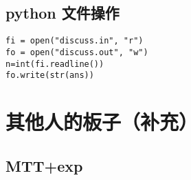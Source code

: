 \documentclass[12pt]{ctexart}
\begin{document}
\subsection{python 文件操作}

\begin{lstlisting}
fi = open("discuss.in", "r")
fo = open("discuss.out", "w")
n=int(fi.readline())
fo.write(str(ans))
\end{lstlisting}

\newpage

\section{其他人的板子（补充）}

\subsection{MTT+exp}
\end{document}
